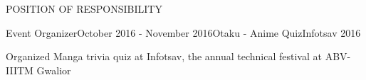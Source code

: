\documentclass{resume} %
\begin{document}
\begin{rSection}{POSITION OF RESPONSIBILITY}

\begin{rSubsection}{Event Organizer}{October 2016 - November 2016}{Otaku - Anime Quiz}{Infotsav 2016}
\item Organized Manga trivia quiz at Infotsav, the annual technical festival at ABV-IIITM Gwalior 

\end{rSubsection}







\end{rSection}
\end{document}
